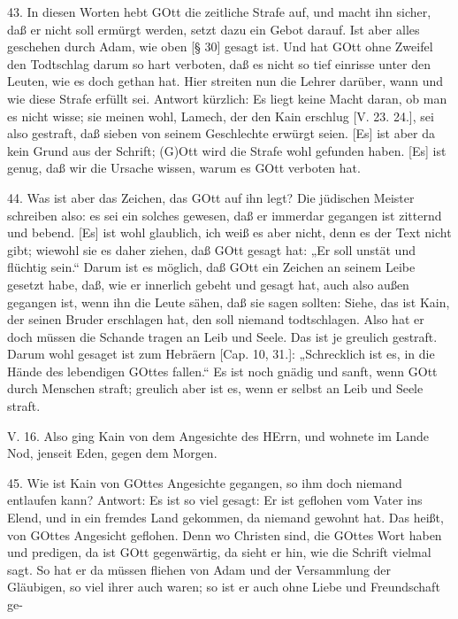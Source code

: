 43. In diesen Worten hebt GOtt die zeitliche Strafe auf, und macht ihn sicher, daß er nicht soll ermürgt werden, setzt dazu ein Gebot darauf.
Ist aber alles geschehen durch Adam, wie oben [§ 30] gesagt ist. Und hat GOtt ohne Zweifel den Todtschlag darum so hart verboten, daß es nicht so tief einrisse unter den Leuten, wie es doch gethan hat. Hier streiten nun die Lehrer darüber, wann und wie diese Strafe erfüllt sei. Antwort kürzlich: Es liegt keine Macht daran, ob man es nicht wisse; sie meinen wohl, Lamech, der den Kain erschlug [V. 23. 24.], sei also gestraft, daß sieben von seinem Geschlechte erwürgt seien. [Es] ist aber da kein Grund aus der Schrift; (G)Ott wird die Strafe wohl gefunden haben. [Es] ist genug, daß wir die Ursache wissen, warum es GOtt verboten hat.

44. Was ist aber das Zeichen, das GOtt auf ihn legt? Die jüdischen Meister schreiben also: es sei ein solches gewesen, daß er immerdar gegangen ist zitternd und bebend. [Es] ist wohl glaublich, ich weiß es aber nicht, denn es der Text nicht gibt; wiewohl sie es daher ziehen, daß GOtt gesagt hat: „Er soll unstät und flüchtig sein.“ Darum ist es möglich, daß GOtt ein Zeichen an seinem Leibe gesetzt habe, daß, wie er innerlich gebeht und gesagt hat, auch also außen gegangen ist, wenn ihn die Leute sähen, daß sie sagen sollten: Siehe, das ist Kain, der seinen Bruder erschlagen hat, den soll niemand todtschlagen. Also hat er doch müssen die Schande tragen an Leib und Seele. Das ist je greulich gestraft. Darum wohl gesaget ist zum Hebräern [Cap. 10, 31.]: „Schrecklich ist es, in die Hände des lebendigen GOttes fallen.“ Es ist noch gnädig und sanft, wenn GOtt durch Menschen straft; greulich aber ist es, wenn er selbst an Leib und Seele straft.

\begin{schriftzitat}
V. 16. Also ging Kain von dem Angesichte des HErrn, und wohnete im Lande Nod, jenseit Eden, gegen dem Morgen.
\end{schriftzitat}

45. Wie ist Kain von GOttes Angesichte gegangen, so ihm doch niemand entlaufen kann? Antwort: Es ist so viel gesagt: Er ist geflohen vom Vater ins Elend, und in ein fremdes Land gekommen, da niemand gewohnt hat. Das heißt, von GOttes Angesicht geflohen. Denn wo Christen sind, die GOttes Wort haben und predigen, da ist GOtt gegenwärtig, da sieht er hin, wie die Schrift vielmal sagt. So hat er da müssen fliehen von Adam und der Versammlung der Gläubigen, so viel ihrer auch waren; so ist er auch ohne Liebe und Freundschaft ge-

